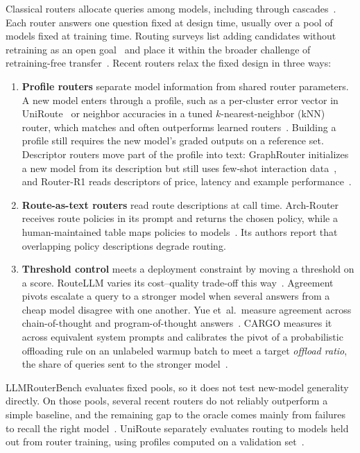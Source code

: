 Classical routers allocate queries among models, including through cascades~\cite{chen2023frugalgpt,ong2024routellm}. Each router answers one question fixed at design time, usually over a pool of models fixed at training time. Routing surveys list adding candidates without retraining as an open goal~\cite{varangotreille2025doing} and place it within the broader challenge of retraining-free transfer~\cite{moslem2026dynamic}. Recent routers relax the fixed design in three ways:
\begin{enumerate}
\item \textbf{Profile routers} separate model information from shared router parameters. A new model enters through a profile, such as a per-cluster error vector in UniRoute~\cite{jitkrittum2025universal} or neighbor accuracies in a tuned $k$-nearest-neighbor (kNN) router, which matches and often outperforms learned routers~\cite{li2025rethinking}. Building a profile still requires the new model's graded outputs on a reference set. Descriptor routers move part of the profile into text: GraphRouter initializes a new model from its description but still uses few-shot interaction data~\cite{feng2024graphrouter}, and Router-R1 reads descriptors of price, latency and example performance~\cite{zhang2025router}.
\item \textbf{Route-as-text routers} read route descriptions at call time. Arch-Router receives route policies in its prompt and returns the chosen policy, while a human-maintained table maps policies to models~\cite{tran2025arch}. Its authors report that overlapping policy descriptions degrade routing.
\item \textbf{Threshold control} meets a deployment constraint by moving a threshold on a score. RouteLLM varies its cost--quality trade-off this way~\cite{ong2024routellm}. Agreement pivots escalate a query to a stronger model when several answers from a cheap model disagree with one another. Yue et~al.\ measure agreement across chain-of-thought and program-of-thought answers~\cite{yue2024large}. CARGO measures it across equivalent system prompts and calibrates the pivot of a probabilistic offloading rule on an unlabeled warmup batch to meet a target \emph{offload ratio}, the share of queries sent to the stronger model~\cite{chen2026routing}.
\end{enumerate}

LLMRouterBench evaluates fixed pools, so it does not test new-model generality directly. On those pools, several recent routers do not reliably outperform a simple baseline, and the remaining gap to the oracle comes mainly from failures to recall the right model~\cite{li2026llmrouterbench}. UniRoute separately evaluates routing to models held out from router training, using profiles computed on a validation set~\cite{jitkrittum2025universal}.


